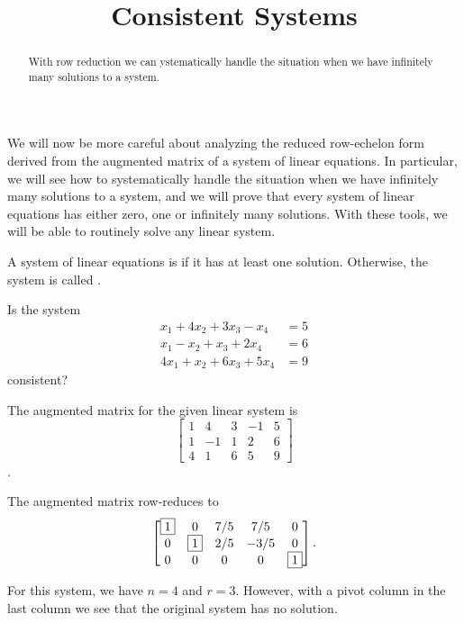 \documentclass{ximera}
\title{Consistent Systems}
\begin{document}
\begin{abstract}
  With row reduction we can ystematically handle the situation when we
  have infinitely many solutions to a system.
\end{abstract}
\maketitle

We will now be more careful about analyzing the reduced row-echelon form derived from the  augmented matrix of a system of linear equations.    In particular, we will see how to systematically handle the situation when we have infinitely many solutions to a system, and we will prove that every system of linear equations has either zero, one or infinitely many solutions.  With these tools, we will be able to routinely solve any linear system.

\begin{definition}
\label{definition:CS}
A system of linear equations is  if it has at least one solution.  Otherwise, the system is called .
\end{definition}

\begin{exercise}
  Is the system
  \begin{align*}
    x_1 + 4x_2 + 3x_3 - x_4 &= 5\\
    x_1 - x_2 + x_3 + 2x_4 &= 6\\
    4x_1 + x_2 + 6x_3 + 5x_4 &= 9
  \end{align*}
  consistent?

  \begin{multipleChoice}
  \end{multipleChoice}

  \begin{hint}
    The augmented matrix for the given linear system is
    \[
      \begin{bmatrix}
        1 & 4 & 3 & -1 & 5\\
        1 & -1 & 1 & 2 & 6\\
        4 & 1 & 6 & 5 & 9
      \end{bmatrix}
    \].
  \end{hint}

  \begin{hint}
    The augmented matrix row-reduces to
    \[\begin{bmatrix}
        \fbox{1} & 0 & 7/5 & 7/5 & 0\\
        0 & \fbox{1} & 2/5 & -3/5 & 0\\
        0 & 0 & 0 & 0 & \fbox{1}
      \end{bmatrix}.\]
  \end{hint}

  \begin{hint}
    For this system, we have $n = 4$ and $r = 3$.  However, with a
    pivot column in the last column we see that the original system
    has no solution.
  \end{hint}
\end{exercise}
\end{document}
